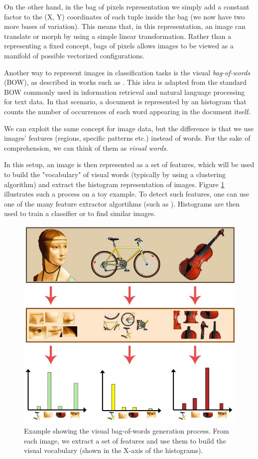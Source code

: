 \documentclass[12pt, twoside, a4paper]{report}
\begin{document}
On the other hand, in the bag of pixels representation we simply add a constant factor to the (X, Y) coordinates of each tuple inside the bag (we now have two more bases of variation). This means that, in this representation, an image can translate or morph by using a simple linear transformation. Rather than a representing a fixed concept, bags of pixels allows images to be viewed as a manifold of possible vectorized configurations.
\bigskip

Another way to represent images in classification tasks is the visual \textit{bag-of-words} (BOW), as described in works such as \cite{bag-of-keypoints, yang-visual-words, yang2-visual-words, old-visual-words, visual-word-reconstruction}. This idea is adapted from the standard BOW commonly used in information retrieval and natural language processing for text data. In that scenario, a document is represented by an histogram that counts the number of occurrences of each word appearing in the document itself. 

We can exploit the same concept for image data, but the difference is that we use images' features (regions, specific patterns etc.) instead of words. For the sake of comprehension, we can think of them as \textit{visual words}. 

In this setup, an image is then represented as a set of features, which will be used to build the "vocabulary" of visual words (typically by using a clustering algorithm) and extract the histogram representation of images. Figure \ref{fig:visual-bag} illustrates such a process on a toy example. To detect such features, one can use one of the many feature extractor algortihms (such as \cite{sift}). Histograms are then used to train a classifier or to find similar images. 


\begin{figure}
\centering
\includegraphics[width=.5\linewidth]{images/paper-images/visual-bag.jpeg}
\caption{Example showing the visual bag-of-words generation process. From each image, we extract a set of features and use them to build the visual vocabulary (shown in the X-axis of the histograms)\protect\footnotemark .}
\label{fig:visual-bag}
\end{figure}
\end{document}
